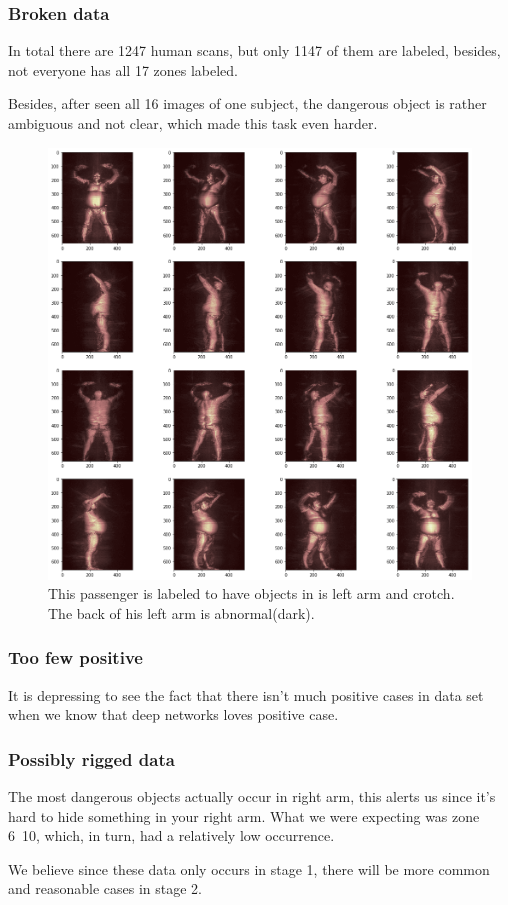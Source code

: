 \documentclass[conference,compsoc]{IEEEtran}
\begin{document}
	\subsubsection{Broken data} In total there are 1247 human scans, but only 1147 of them are labeled, besides, not everyone has all 17 zones labeled. 
	\par Besides, after seen all 16 images of one subject, the dangerous object is rather ambiguous and not clear, which made this task even harder.
	\begin{figure}[h] \label{ffefec}
		\centering
		\includegraphics[width=0.9\linewidth]{./Pic/ffefec0cd4e1e2c3fe64bb93f082efdd}
		\caption{This passenger is labeled to have objects in is left arm and crotch. The back of his left arm is abnormal(dark).}
	\end{figure}
	\subsubsection{Too few positive} It is depressing to see the fact that there isn't much positive cases in data set when we know that deep networks loves positive case.	
	\subsubsection{Possibly rigged data} The most dangerous objects actually occur in right arm, this alerts us since it's hard to hide something in your right arm. What we were expecting was zone 6~10, which, in turn, had a relatively low occurrence.  
	\par We believe since these data only occurs in stage 1, there will be more common and reasonable cases in stage 2.
\end{document}
